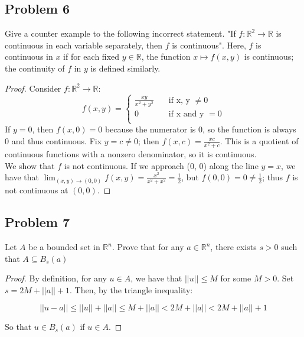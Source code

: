\documentclass{article}
\begin{document}
\subsection*{Problem 6}
Give a counter example to the following incorrect statement.
"If $f \colon \mathbb{R}^2 \to \mathbb{R}$ is continuous in each variable separately, then $f$ is continuous". Here, $f$ is continuous in $x$ if for each fixed $y \in \mathbb{R}$, the function $x \mapsto f(x, y)$ is continuous; the continuity of $f$ in $y$ is defined similarly.

\begin{proof}
Consider $f \colon \mathbb{R}^2 \to \mathbb{R}$:
\[ f(x, y)=\begin{cases}
          \frac{xy}{x^2 + y^2} \quad &\text{if x, y } \neq 0 \\
          0 \quad &\text{if x and y }= 0 \\
          \end{cases}\]
If $y = 0$, then $f(x, 0) = 0$ because the numerator is 0, so the function is always 0 and thus continuous. Fix $y = c \neq 0$; then $f(x, c) = \frac{xc}{x^2 + c}$. This is a quotient of continuous functions with a nonzero denominator, so it is continuous. \\
We show that $f$ is not continuous. If we approach (0, 0) along the line $y = x$, we have that $\lim_{(x, y)\to(0, 0)} f(x, y) = \frac{x^2}{x^2 + x^2} = \frac{1}{2}$, but $f(0, 0) = 0 \neq \frac{1}{2}$; thus $f$ is not continuous at $(0, 0)$. 
\end{proof}

\subsection*{Problem 7}
Let $A$ be a bounded set in $\mathbb{R}^n$. Prove that for any $a \in \mathbb{R}^n$, there exists $s > 0$ such that $A \subseteq B_s(a)$
\begin{proof}
By definition, for any $u \in A$, we have that $||u|| \leq M$ for some $M > 0$. Set $s = 2M + ||a|| + 1$. Then, by the triangle inequality:

\[ ||u-a|| \leq ||u|| + ||a|| \leq M + ||a|| < 2M + ||a|| < 2M + ||a|| + 1\]

So that $u \in B_s(a)$ if $u \in A$.

\end{proof}
\end{document}
